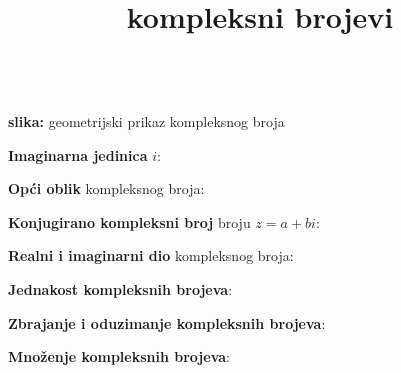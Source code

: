 \documentclass[8pt,oneside,a4paper]{report}
\title{kompleksni brojevi}
\begin{document}
\begin{center}
\end{center}

\begin{floatingfigure}[r]{60mm}
\\
\scriptsize{\textbf{slika:} geometrijski prikaz kompleksnog broja}
\end{floatingfigure}
\noindent
\textbf{Imaginarna jedinica} $i$:\hspace{5mm}

\noindent
\textbf{Op\'{c}i oblik} kompleksnog broja:\hspace{5mm}

\noindent
\textbf{Konjugirano kompleksni broj} broju $z=a+bi$:\\
\hspace*{25mm}

\noindent
\textbf{Realni i imaginarni dio} kompleksnog broja:\\ 
\hspace*{25mm}
	\hspace{5mm}

\noindent
\textbf{Jednakost kompleksnih brojeva}:\\
	\hspace*{10mm}

\begin{center}
\end{center}

\noindent
\textbf{Zbrajanje i oduzimanje kompleksnih brojeva}:\hspace{5mm}


\noindent
\textbf{Mno\v{z}enje kompleksnih brojeva}:\hspace{5mm}
\end{document}
